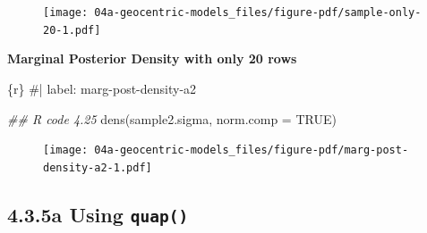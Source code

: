 \documentclass[
  letterpaper,
  DIV=11,
  numbers=noendperiod]{scrreprt}
\newenvironment{Shaded}{\begin{snugshade}}{\end{snugshade}}
\newcommand{\AttributeTok}[1]{\textcolor[rgb]{0.40,0.45,0.13}{#1}}
\newcommand{\CommentTok}[1]{\textcolor[rgb]{0.37,0.37,0.37}{#1}}
\newcommand{\ConstantTok}[1]{\textcolor[rgb]{0.56,0.35,0.01}{#1}}
\newcommand{\DecValTok}[1]{\textcolor[rgb]{0.68,0.00,0.00}{#1}}
\newcommand{\DocumentationTok}[1]{\textcolor[rgb]{0.37,0.37,0.37}{\textit{#1}}}
\newcommand{\FloatTok}[1]{\textcolor[rgb]{0.68,0.00,0.00}{#1}}
\newcommand{\FunctionTok}[1]{\textcolor[rgb]{0.28,0.35,0.67}{#1}}
\newcommand{\InformationTok}[1]{\textcolor[rgb]{0.37,0.37,0.37}{#1}}
\newcommand{\NormalTok}[1]{\textcolor[rgb]{0.00,0.23,0.31}{#1}}
\newcommand{\OtherTok}[1]{\textcolor[rgb]{0.00,0.23,0.31}{#1}}
\newcommand{\SpecialCharTok}[1]{\textcolor[rgb]{0.37,0.37,0.37}{#1}}
\newcommand{\StringTok}[1]{\textcolor[rgb]{0.13,0.47,0.30}{#1}}
\begin{document}
\begin{Shaded}
\end{Shaded}

\begin{figure}[H]

{\centering \texttt{[image: 04a-geocentric-models\_files/figure-pdf/sample-only-20-1.pdf]}

}

\end{figure}

\textbf{Marginal Posterior Density with only 20 rows}

\begin{Shaded}
\begin{Highlighting}[]
\InformationTok{\textasciigrave{}\textasciigrave{}\textasciigrave{}\{r\}}
\CommentTok{\#| label: marg{-}post{-}density{-}a2}

\DocumentationTok{\#\# R code 4.25}
\FunctionTok{dens}\NormalTok{(sample2.sigma, }\AttributeTok{norm.comp =} \ConstantTok{TRUE}\NormalTok{)}
\InformationTok{\textasciigrave{}\textasciigrave{}\textasciigrave{}}
\end{Highlighting}
\end{Shaded}

\begin{figure}[H]

{\centering \texttt{[image: 04a-geocentric-models\_files/figure-pdf/marg-post-density-a2-1.pdf]}

}

\end{figure}

\hypertarget{a-using-quap}{%
\subsection{\texorpdfstring{4.3.5a Using
\texttt{quap()}}{4.3.5a Using quap()}}\label{a-using-quap}}
\end{document}
